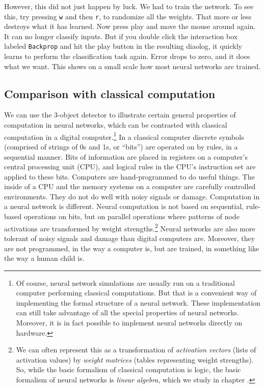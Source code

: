 However, this did not just happen by luck. We had to train the network. To see this, try pressing \texttt{w} and then \texttt{r}, to randomize all the weights. That more or less destroys what it has learned. Now press play and move the mouse around again. It can no longer classify inputs. But if you double click the interaction box labeled \texttt{Backprop} and hit the play button in the resulting diaolog, it quickly learns to perform the classification task again. Error drops to zero, and it does what we want. This shows on a small scale how most neural networks are trained.

\subsection{Comparison with classical computation}


We can use the 3-object detector to illustrate certain  general properties of computation in neural networks, which can be contrasted with classical computation in a digital computer.\footnote{Of course, neural network simulations are usually run on a traditional computer performing classical computations. But that is a convenient way of implementing the formal structure of a neural network. These implementation can still take advantage of all the special properties of neural networks. Moreover, it is in fact possible to implement neural networks directly on hardware.} In a classical computer discrete symbols (comprised of strings of 0s and 1s, or ``bits'') are operated on by rules, in a sequential manner. Bits of information are placed in registers on a computer's central processing unit (CPU), and logical rules in the CPU's instruction set are applied to these bits. Computers are hand-programmed to do useful things. The inside of a CPU and the memory systems on a computer are carefully controlled environments. They do not do well with noisy signals or damage. Computation in a neural network is  different. Neural computation is not based on sequential, rule-based operations on bits, but on parallel operations where patterns of node activations are transformed by weight strengths.\footnote{We can often represent this as a transformation of \emph{activation vectors} (lists of activation values) by \emph{weight matrices} (tables representing weight strengths). So, while the basic formalism of classical computation is logic,  the basic formalism of neural networks is \emph{linear algebra}, which we study in chapter .}    Neural networks are also more tolerant of noisy signals and damage than digital computers are. Moreover, they are not programmed, in the way a computer is, but are trained, in something like the way a human child is.

